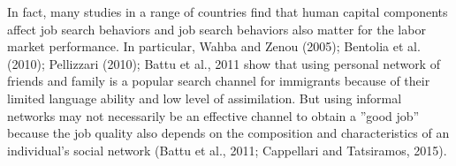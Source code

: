 \documentclass[12pt,a4paper]{article}
\begin{document}



In fact, many studies in a range of countries find that human capital components affect job search behaviors and job search behaviors also matter for the labor market performance. In particular, Wahba and Zenou (2005); Bentolia et al. (2010); Pellizzari (2010); Battu et al., 2011 show that using personal network of friends and family is a popular search channel for immigrants because of their limited language ability and low level of assimilation. But using informal networks may not necessarily be an effective channel to obtain a ''good job'' because the job quality also depends on the composition and characteristics of an individual's social network (Battu et al., 2011; Cappellari and Tatsiramos, 2015). 



\end{document}
